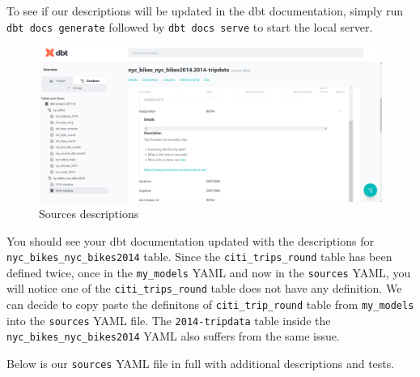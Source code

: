 \documentclass[
]{book}
\begin{document}
To see if our descriptions will be updated in the dbt documentation, simply run \texttt{dbt\ docs\ generate} followed by \texttt{dbt\ docs\ serve} to start the local server.

\begin{figure}
\centering
\includegraphics{./images/sources_definitions.png}
\caption{Sources descriptions}
\end{figure}

You should see your dbt documentation updated with the descriptions for \texttt{nyc\_bikes\_nyc\_bikes2014} table. Since the \texttt{citi\_trips\_round} table has been defined twice, once in the \texttt{my\_models} YAML and now in the \texttt{sources} YAML, you will notice one of the \texttt{citi\_trips\_round} table does not have any definition. We can decide to copy paste the definitons of \texttt{citi\_trip\_round} table from \texttt{my\_models} into the \texttt{sources} YAML file. The \texttt{2014-tripdata} table inside the \texttt{nyc\_bikes\_nyc\_bikes2014} YAML also suffers from the same issue.

Below is our \texttt{sources} YAML file in full with additional descriptions and tests.
\end{document}
